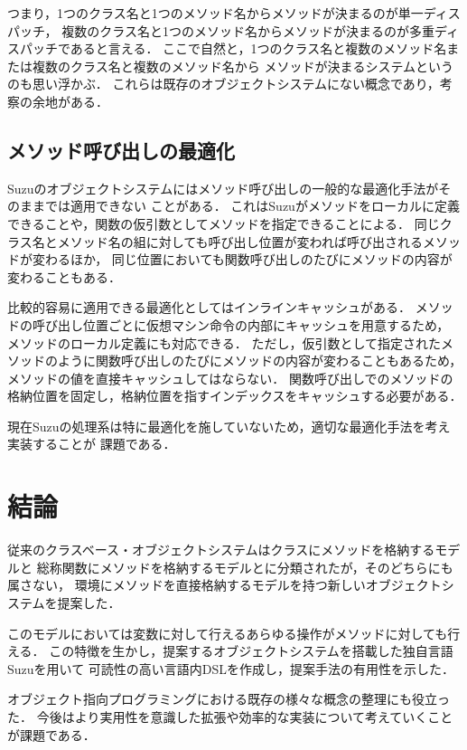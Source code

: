 \documentclass{ipsjprosym}
\begin{document}
つまり，1つのクラス名と1つのメソッド名からメソッドが決まるのが単一ディスパッチ，
複数のクラス名と1つのメソッド名からメソッドが決まるのが多重ディスパッチであると言える．
ここで自然と，1つのクラス名と複数のメソッド名または複数のクラス名と複数のメソッド名から
メソッドが決まるシステムというのも思い浮かぶ．
これらは既存のオブジェクトシステムにない概念であり，考察の余地がある．

\subsection{メソッド呼び出しの最適化}

Suzuのオブジェクトシステムにはメソッド呼び出しの一般的な最適化手法がそのままでは適用できない
ことがある．
これはSuzuがメソッドをローカルに定義できることや，関数の仮引数としてメソッドを指定できることによる．
同じクラス名とメソッド名の組に対しても呼び出し位置が変われば呼び出されるメソッドが変わるほか，
同じ位置においても関数呼び出しのたびにメソッドの内容が変わることもある．

比較的容易に適用できる最適化としてはインラインキャッシュ\cite{Onodera:1997-04-15}がある．
メソッドの呼び出し位置ごとに仮想マシン命令の内部にキャッシュを用意するため，
メソッドのローカル定義にも対応できる．
ただし，仮引数として指定されたメソッドのように関数呼び出しのたびにメソッドの内容が変わることもあるため，
メソッドの値を直接キャッシュしてはならない．
関数呼び出しでのメソッドの格納位置を固定し，格納位置を指すインデックスをキャッシュする必要がある．

現在Suzuの処理系は特に最適化を施していないため，適切な最適化手法を考え実装することが
課題である．

\section{結論}

従来のクラスベース・オブジェクトシステムはクラスにメソッドを格納するモデルと
総称関数にメソッドを格納するモデルとに分類されたが，そのどちらにも属さない，
環境にメソッドを直接格納するモデルを持つ新しいオブジェクトシステムを提案した．

このモデルにおいては変数に対して行えるあらゆる操作がメソッドに対しても行える．
この特徴を生かし，提案するオブジェクトシステムを搭載した独自言語Suzuを用いて
可読性の高い言語内DSLを作成し，提案手法の有用性を示した．

オブジェクト指向プログラミングにおける既存の様々な概念の整理にも役立った．
今後はより実用性を意識した拡張や効率的な実装について考えていくことが課題である．
\end{document}
